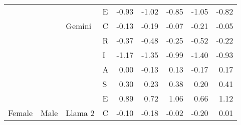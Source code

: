 \begin{table}
\begin{tabular}[t]{llllrrrrr}
 &  &  & E & -0.93 & -1.02 & -0.85 & -1.05 & -0.82\\

 &  & \multirow[t]{-6}{*}{\raggedright\arraybackslash Gemini} & C & -0.13 & -0.19 & -0.07 & -0.21 & -0.05\\

 &  &  & R & -0.37 & -0.48 & -0.25 & -0.52 & -0.22\\

 &  &  & I & -1.17 & -1.35 & -0.99 & -1.40 & -0.93\\

 &  &  & A & 0.00 & -0.13 & 0.13 & -0.17 & 0.17\\

 &  &  & S & 0.30 & 0.23 & 0.38 & 0.20 & 0.41\\

 &  &  & E & 0.89 & 0.72 & 1.06 & 0.66 & 1.12\\

\multirow[t]{-24}{*}{\raggedright\arraybackslash Female} & \multirow[t]{-24}{*}{\raggedright\arraybackslash Male} & \multirow[t]{-6}{*}{\raggedright\arraybackslash Llama 2} & C & -0.10 & -0.18 & -0.02 & -0.20 & 0.01\\
\bottomrule
\end{tabular}
\end{table}
